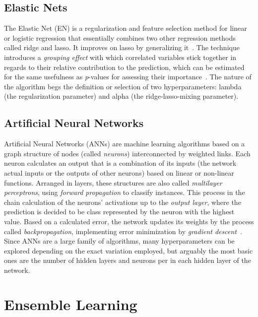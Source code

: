 \subsection{Elastic Nets}\label{subsec:elastic_nets}

The Elastic Net (EN) is a regularization and feature selection method for linear or logistic regression that essentially combines two other regression methods called ridge and lasso.
It improves on lasso by generalizing it~\cite{Zou2005}.
The technique introduces a \textit{grouping effect} with which correlated variables stick together in regards to their relative contribution to the prediction, which can be estimated for the same usefulness as \textit{p}-values for assessing their importance~\cite{Burke2018}.
The nature of the algorithm begs the definition or selection of two hyperparameters: lambda (the regularization parameter) and alpha (the ridge-lasso-mixing parameter).

\subsection{Artificial Neural Networks}\label{subsec:anns}

Artificial Neural Networks (ANNs) are machine learning algorithms based on a graph structure of nodes (called \textit{neurons}) interconnected by weighted links.
Each neuron calculates an output that is a combination of its inputs (the network actual inputs or the outputs of other neurons) based on linear or non-linear functions.
Arranged in layers, these structures are also called \textit{multilayer perceptrons}, using \textit{forward propagation} to classify instances.
This process in the chain calculation of the neurons' activations up to the \textit{output layer}, where the prediction is decided to be class represented by the neuron with the highest value.
Based on a calculated error, the network updates its weights by the process called \textit{backpropagation}, implementing error minimization by \textit{gradient descent}~\cite{Kubat2017}.
Since ANNs are a large family of algorithms, many hyperparameters can be explored depending on the exact variation employed, but arguably the most basic ones are the number of hidden layers and neurons per in each hidden layer of the network.


\section{Ensemble Learning}\label{sec:ensemble-learning}

